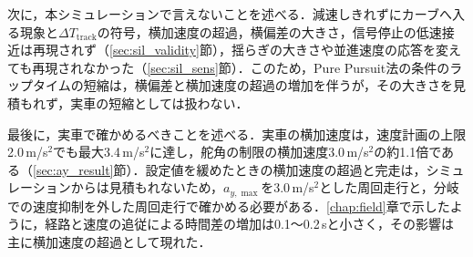 次に，本シミュレーションで言えないことを述べる．減速しきれずにカーブへ入る現象と$\Delta T_{\mathrm{track}}$の符号，横加速度の超過，横偏差の大きさ，信号停止の低速接近は再現されず（\ref{sec:sil_validity}節），揺らぎの大きさや並進速度の応答を変えても再現されなかった（\ref{sec:sil_sens}節）．このため，Pure Pursuit法の条件のラップタイムの短縮は，横偏差と横加速度の超過の増加を伴うが，その大きさを見積もれず，実車の短縮としては扱わない．

最後に，実車で確かめるべきことを述べる．実車の横加速度は，速度計画の上限2.0\,m/s$^2$でも最大3.4\,m/s$^2$に達し，舵角の制限の横加速度3.0\,m/s$^2$の約1.1倍である（\ref{sec:ay_result}節）．設定値を緩めたときの横加速度の超過と完走は，シミュレーションからは見積もれないため，$a_{y,\max}$を3.0\,m/s$^2$とした周回走行と，分岐での速度抑制を外した周回走行で確かめる必要がある．\ref{chap:field}章で示したように，経路と速度の追従による時間差の増加は0.1〜0.2\,sと小さく，その影響は主に横加速度の超過として現れた．
